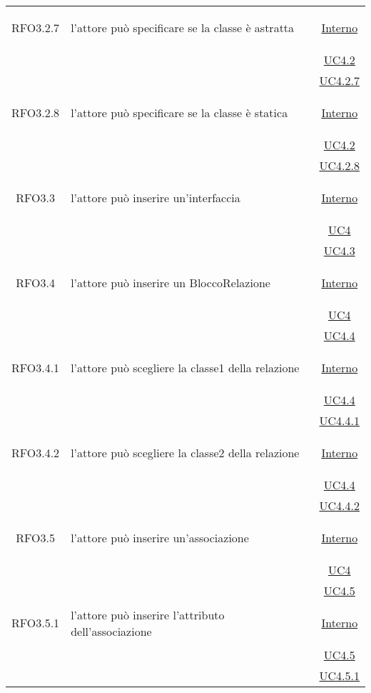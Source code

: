 \begin{longtable}{|c|>{\centering}m{7cm}|c|}
\hypertarget{RFO3.2.7}{RFO3.2.7} & l'attore può specificare se la classe è astratta & \hyperlink{Interno}{Interno}\\
& &\hyperref[UC4.2]{UC4.2}\\
& &\hyperref[UC4.2.7]{UC4.2.7}\\ \hline

\hypertarget{RFO3.2.8}{RFO3.2.8} & l'attore può specificare se la classe è statica & \hyperlink{Interno}{Interno}\\
& &\hyperref[UC4.2]{UC4.2}\\
& &\hyperref[UC4.2.8]{UC4.2.8}\\ \hline

\hypertarget{RFO3.3}{RFO3.3} & l'attore può inserire un'interfaccia &  \hyperlink{Interno}{Interno}\\
& &\hyperref[UC4]{UC4}\\
& &\hyperref[UC4.3]{UC4.3}\\ \hline

\hypertarget{RFO3.4}{RFO3.4} & l'attore può inserire un BloccoRelazione &  \hyperlink{Interno}{Interno}\\
& &\hyperref[UC4]{UC4}\\
& &\hyperref[UC4.4]{UC4.4}\\ \hline

\hypertarget{RFO3.4.1}{RFO3.4.1} & l'attore può scegliere la classe1 della relazione &  \hyperlink{Interno}{Interno}\\
& &\hyperref[UC4.4]{UC4.4}\\
& &\hyperref[UC4.4.1]{UC4.4.1}\\ \hline

\hypertarget{RFO3.4.2}{RFO3.4.2} & l'attore può scegliere la classe2 della relazione &  \hyperlink{Interno}{Interno}\\
& &\hyperref[UC4.4]{UC4.4}\\
& &\hyperref[UC4.4.2]{UC4.4.2}\\ \hline

\hypertarget{RFO3.5}{RFO3.5} & l'attore può inserire un'associazione &  \hyperlink{Interno}{Interno}\\
& &\hyperref[UC4]{UC4}\\
& &\hyperref[UC4.5]{UC4.5}\\ \hline

\hypertarget{RFO3.5.1}{RFO3.5.1} & l'attore può inserire l'attributo dell'associazione &  \hyperlink{Interno}{Interno}\\
& &\hyperref[UC4.5]{UC4.5}\\
& &\hyperref[UC4.5.1]{UC4.5.1}\\ \hline


\end{longtable}
